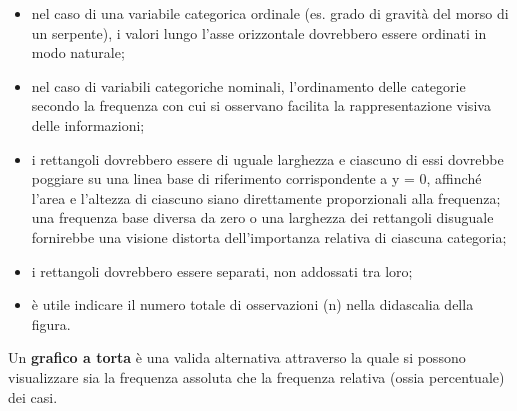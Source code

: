 \documentclass[drafts, 10pt]{book}
\begin{document}
\begin{itemize}
    \item nel caso di una variabile categorica ordinale (es. grado di gravità del morso di un serpente), i valori lungo l'asse orizzontale dovrebbero essere ordinati in modo naturale;
    \item nel caso di variabili categoriche nominali, l'ordinamento delle categorie secondo la frequenza con cui si osservano facilita la rappresentazione visiva delle informazioni;
    \item i rettangoli dovrebbero essere di uguale larghezza e ciascuno di essi dovrebbe poggiare su una linea base di riferimento corrispondente a y = 0, affinché l'area e l'altezza di ciascuno siano direttamente proporzionali alla frequenza; una frequenza base diversa da zero o una larghezza dei rettangoli disuguale fornirebbe una visione distorta dell'importanza relativa di ciascuna categoria;
    \item i rettangoli dovrebbero essere separati, non addossati tra loro;
    \item è utile indicare il numero totale di osservazioni (n) nella didascalia della figura.
\end{itemize}
Un \textbf{grafico a torta} è una valida alternativa attraverso la quale si possono visualizzare sia la frequenza assoluta che la frequenza relativa (ossia percentuale) dei casi.
\end{document}
